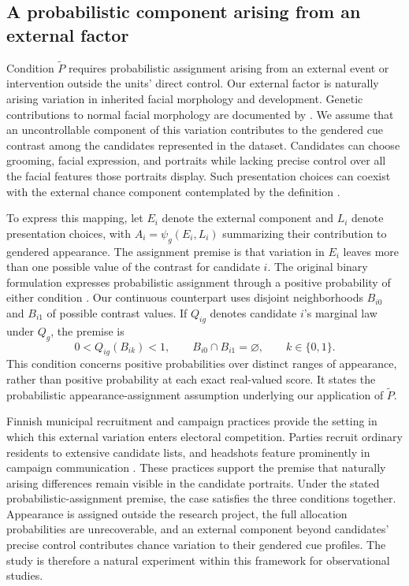 \documentclass[11pt,a4paper]{article}\usepackage[]{graphicx}\usepackage[]{xcolor}
\begin{document}
\subsection{A probabilistic component arising from an external factor}

Condition $\widetilde P$ requires probabilistic assignment arising from an external event or intervention outside the units' direct control. Our external factor is naturally arising variation in inherited facial morphology and development. Genetic contributions to normal facial morphology are documented by \textcite{LiuEtAl2012}. We assume that an uncontrollable component of this variation contributes to the gendered cue contrast among the candidates represented in the dataset. Candidates can choose grooming, facial expression, and portraits while lacking precise control over all the facial features those portraits display. Such presentation choices can coexist with the external chance component contemplated by the definition \parencite[118--119]{Titiunik2021}.

To express this mapping, let $E_i$ denote the external component and $L_i$ denote presentation choices, with $A_i=\psi_g(E_i,L_i)$ summarizing their contribution to gendered appearance. The assignment premise is that variation in $E_i$ leaves more than one possible value of the contrast for candidate $i$. The original binary formulation expresses probabilistic assignment through a positive probability of either condition \parencite[108]{Titiunik2021}. Our continuous counterpart uses disjoint neighborhoods $B_{i0}$ and $B_{i1}$ of possible contrast values. If $Q_{ig}$ denotes candidate $i$'s marginal law under $Q_g$, the premise is
\begin{equation}
 0<Q_{ig}(B_{ik})<1,
 \qquad B_{i0}\cap B_{i1}=\varnothing,
 \qquad k\in\{0,1\}.
\label{eq:ne-probabilistic-support}
\end{equation}
This condition concerns positive probabilities over distinct ranges of appearance, rather than positive probability at each exact real-valued score. It states the probabilistic appearance-assignment assumption underlying our application of $\widetilde P$.

Finnish municipal recruitment and campaign practices provide the setting in which this external variation enters electoral competition. Parties recruit ordinary residents to extensive candidate lists, and headshots feature prominently in campaign communication \parencite[628--629]{Bahamonde2024}. These practices support the premise that naturally arising differences remain visible in the candidate portraits. Under the stated probabilistic-assignment premise, the case satisfies the three conditions together. Appearance is assigned outside the research project, the full allocation probabilities are unrecoverable, and an external component beyond candidates' precise control contributes chance variation to their gendered cue profiles. The study is therefore a natural experiment within this framework for observational studies.
\end{document}
